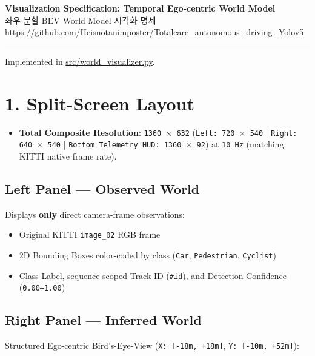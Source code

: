 \documentclass[10.5pt,a4paper]{article}
\begin{document}
\begin{center}
{\LARGE\bfseries Visualization Specification: Temporal Ego-centric World Model}\\[6pt]
{\normalsize\color{gray} 좌우 분할 BEV World Model 시각화 명세}\\[4pt]
{\small\href{https://github.com/Heisnotanimposter/Totalcare_autonomous_driving_Yolov5}{https://github.com/Heisnotanimposter/Totalcare\_autonomous\_driving\_Yolov5}}
\end{center}
\vspace{4pt}
\hrule
\vspace{8pt}

Implemented in \href{https://github.com/Heisnotanimposter/Totalcare\_autonomous\_driving\_Yolov5/blob/main/src/world\_visualizer.py}{src/world\_visualizer.py}.


\section{1. Split-Screen Layout}

\begin{itemize}[leftmargin=1.5em,itemsep=2pt]
\item \textbf{Total Composite Resolution}: \texttt{1360 $\times$ 632} (\texttt{Left:\allowbreak{} 720 $\times$ 540} | \texttt{Right:\allowbreak{} 640 $\times$ 540} | \texttt{Bottom Telemetry HUD:\allowbreak{} 1360 $\times$ 92}) at \texttt{10 Hz} (matching KITTI native frame rate).
\end{itemize}

\subsection{Left Panel --- Observed World}
Displays \textbf{only} direct camera-frame observations:

\begin{itemize}[leftmargin=1.5em,itemsep=2pt]
\item Original KITTI \texttt{image\_\allowbreak{}02} RGB frame
\item 2D Bounding Boxes color-coded by class (\texttt{Car}, \texttt{Pedestrian}, \texttt{Cyclist})
\item Class Label, sequence-scoped Track ID (\texttt{\#id}), and Detection Confidence (\texttt{0.\allowbreak{}00--1.\allowbreak{}00})
\end{itemize}

\subsection{Right Panel --- Inferred World}
Structured Ego-centric Bird's-Eye-View (\texttt{X:\allowbreak{} [-\allowbreak{}18m,\allowbreak{} +18m]}, \texttt{Y:\allowbreak{} [-\allowbreak{}10m,\allowbreak{} +52m]}):
\end{document}
